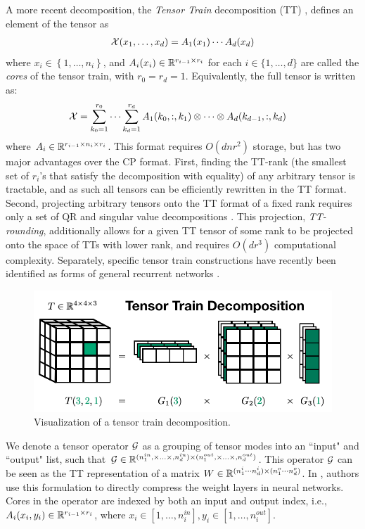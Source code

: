A more recent decomposition, the \textit{Tensor Train} decomposition (TT) \citep{oseledets2011tensor}, defines an element of the tensor as
\begin{align}
\mathcal{X}(x_1,\ldots,x_d) = A_1(x_1)\cdots A_d(x_d)
\end{align}
where $x_i \in \left\{1,\ldots, n_i\right\}$, and $A_i(x_i) \in \mathbb{R}^{r_{i-1} \times r_{i}}$ for each $i \in \{1,\ldots,d\}$ are called the \textit{cores} of the tensor train, with $r_0 = r_d = 1$. Equivalently, the full tensor is written as:
\begin{align}\label{eq:fullTT}
	\mathcal{X} &= \sum_{k_0 = 1}^{r_0} \cdots \sum_{k_d = 1}^{r_d} A_1(k_0,:,k_1) \otimes \cdots \otimes A_d(k_{d-1},:,k_d) 
\end{align}
where $A_i \in \mathbb{R}^{r_{i-1}\times n_i \times r_i} $. 
This format requires $O(dnr^2)$ storage, but has two major advantages over the CP format. First, finding the TT-rank (the smallest set of $r_i$'s that satisfy the decomposition with equality) of any arbitrary tensor is tractable, and as such all tensors can be efficiently rewritten in the TT format. Second, projecting arbitrary tensors onto the TT format of a fixed rank requires only a set of QR and singular value decompositions \citep{oseledets2011tensor}. This projection, \textit{TT-rounding}, additionally allows for a given TT tensor of some rank to be projected onto the space of TTs with lower rank, and requires $O(dr^3)$ computational complexity. Separately, specific tensor train constructions have recently been identified as forms of general recurrent networks \citep{khrulkov2018generalized}.
\begin{figure}
	\includegraphics[width=\textwidth]{2_bknd/tt_decomp.png}
	\caption[Tensor train decomposition]{\label{fig:ttdecomp} Visualization of a tensor train decomposition.}
\end{figure}
We denote a tensor operator $\mathcal{G}$ as a grouping of tensor modes into an ``input" and ``output" list, such that $\mathcal{G} \in \mathbb{R}^{(n_1^{in},\times\ldots\times,n_d^{in}) \times (n_1^{out},\times\ldots\times,n_d^{out})}$. This operator $\mathcal{G}$ can be seen as the TT representation of a matrix $W \in \mathbb{R}^{(n_1^i\cdots n_d^i) \times (n_1^o\cdots n_d^o)}$. In \cite{novikov2015tensorizing}, authors use this formulation to directly compress the weight layers in neural networks. Cores in the operator are indexed by both an input and output index, i.e., $A_i(x_i,y_i) \in \mathbb{R}^{r_{i-1}\times r_i}$, where $x_i \in [1,\ldots,n_i^{in}], y_i \in [1,\ldots,n_i^{out}]$.

